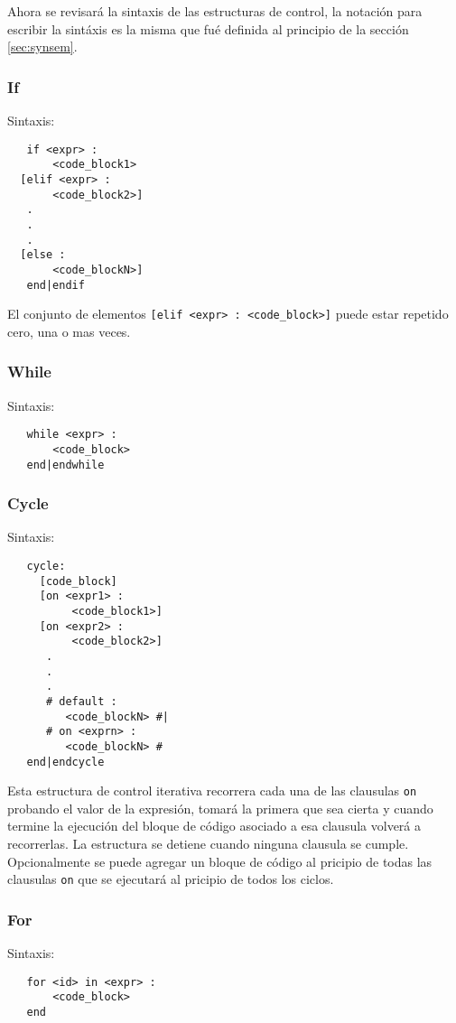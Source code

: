 \documentclass[12pt, spanish]{report}
\begin{document}
Ahora se revisar\'a la sintaxis de las estructuras de control, la
notaci\'on para escribir la sintáxis es la misma que fué definida al
principio de la secci\'on \ref{sec:synsem}.

\subsubsection{If}
Sintaxis:
\begin{verbatim}
   if <expr> :
       <code_block1>
  [elif <expr> :
       <code_block2>]
   .
   .
   .
  [else :
       <code_blockN>]
   end|endif
\end{verbatim}

El conjunto de elementos \texttt{[elif <expr> : <code_block>]} puede
estar repetido cero, una o mas veces.

\subsubsection{While}
Sintaxis:
\begin{verbatim}
   while <expr> :
       <code_block>
   end|endwhile
\end{verbatim}

\subsubsection{Cycle}
Sintaxis:
\begin{verbatim}
   cycle:
     [code_block]
     [on <expr1> :
          <code_block1>]
     [on <expr2> :
          <code_block2>]
      .
      .
      .
      # default :
         <code_blockN> #|
      # on <exprn> : 
         <code_blockN> #
   end|endcycle
\end{verbatim}

Esta estructura de control iterativa recorrera cada una de las
clausulas \texttt{on} probando el valor de la expresi\'on, tomar\'a la
primera que sea cierta y cuando termine la ejecuci\'on del bloque de
c\'odigo asociado a esa clausula volver\'a a recorrerlas. La
estructura se detiene cuando ninguna clausula se cumple. Opcionalmente
se puede agregar un bloque de c\'odigo al pricipio de todas las
clausulas \texttt{on} que se ejecutar\'a al pricipio de todos los
ciclos.

\subsubsection{For}
Sintaxis:
\begin{verbatim}
   for <id> in <expr> :
       <code_block>
   end
\end{verbatim}
\end{document}
